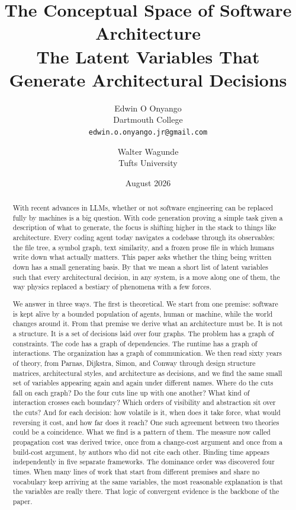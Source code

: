 \documentclass[11pt,oneside]{article}
\title{\vspace{-1.0cm}\textbf{\color{accent}The Conceptual Space of Software Architecture}\\[0.35cm]
\large The Latent Variables That Generate Architectural Decisions}
\author{Edwin O Onyango\\[-1pt]
\small Dartmouth College\\
\small \texttt{edwin.o.onyango.jr@gmail.com}
\and
Walter Wagunde\\[-1pt]
\small Tufts University}
\date{August 2026}
\theoremstyle{definition}
\begin{document}
\maketitle
\thispagestyle{empty}

\begin{abstract}
\noindent With recent advances in LLMs, whether or not software engineering can be replaced fully
by machines is a big question. With code generation proving a simple task given a description of
what to generate, the focus is shifting higher in the stack to things like architecture. Every
coding agent today navigates a codebase through its observables: the file tree, a symbol graph, text
similarity, and a frozen prose file in which humans write down what actually matters. This paper
asks whether the thing being written down has a small generating basis. By that we mean a short
list of latent variables such that every architectural decision, in any system, is a move along
one of them, the way physics replaced a bestiary of phenomena with a few forces.

We answer in three ways. The first is theoretical. We start from one premise: software is kept
alive by a bounded population of agents, human or machine, while the world changes around it.
From that premise we derive what an architecture must be. It is not a structure. It is a set of
decisions laid over four graphs. The problem has a graph of constraints. The code has a graph
of dependencies. The runtime has a graph of interactions. The organization has a graph of
communication. We then read sixty years of theory, from Parnas, Dijkstra, Simon, and Conway
through design structure matrices, architectural styles, and architecture as decisions, and we
find the same small set of variables appearing again and again under different names. Where do
the cuts fall on each graph? Do the four cuts line up with one another? What kind of
interaction crosses each boundary? Which orders of visibility and abstraction sit over the
cuts? And for each decision: how volatile is it, when does it take force, what would reversing
it cost, and how far does it reach? One such agreement between two theories could be a
coincidence. What we find is a pattern of them. The measure now called propagation cost was
derived twice, once from a change-cost argument and once from a build-cost argument, by authors
who did not cite each other. Binding time appears independently in five separate frameworks.
The dominance order was discovered four times. When many lines of work that start from
different premises and share no vocabulary keep arriving at the same variables, the most
reasonable explanation is that the variables are really there. That logic of convergent
evidence is the backbone of the paper.


\end{abstract}
\end{document}
